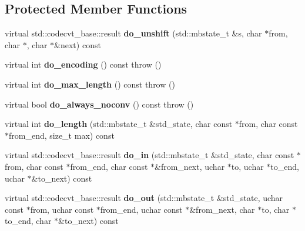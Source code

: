 \subsection*{Protected Member Functions}
\begin{DoxyCompactItemize}
\item 
virtual std\+::codecvt\+\_\+base\+::result {\bfseries do\+\_\+unshift} (std\+::mbstate\+\_\+t \&s, char $\ast$from, char $\ast$, char $\ast$\&next) const \label{classbooster_1_1locale_1_1generic__codecvt_3_01CharType_00_01CodecvtImpl_00_012_01_4_ac229b7b228bb3e6254ce32f538e8ef0f}

\item 
virtual int {\bfseries do\+\_\+encoding} () const   throw ()\label{classbooster_1_1locale_1_1generic__codecvt_3_01CharType_00_01CodecvtImpl_00_012_01_4_a7b264499fd7e204121b1d42c7a13c4b6}

\item 
virtual int {\bfseries do\+\_\+max\+\_\+length} () const   throw ()\label{classbooster_1_1locale_1_1generic__codecvt_3_01CharType_00_01CodecvtImpl_00_012_01_4_a0e8a98fbf8d36331f98c66575aee7115}

\item 
virtual bool {\bfseries do\+\_\+always\+\_\+noconv} () const   throw ()\label{classbooster_1_1locale_1_1generic__codecvt_3_01CharType_00_01CodecvtImpl_00_012_01_4_ab0f0b4d26cece69ee7858ce129322f1a}

\item 
virtual int {\bfseries do\+\_\+length} (std\+::mbstate\+\_\+t \&std\+\_\+state, char const $\ast$from, char const $\ast$from\+\_\+end, size\+\_\+t max) const \label{classbooster_1_1locale_1_1generic__codecvt_3_01CharType_00_01CodecvtImpl_00_012_01_4_aae2712941bdf422f8edf8496fe08384a}

\item 
virtual std\+::codecvt\+\_\+base\+::result {\bfseries do\+\_\+in} (std\+::mbstate\+\_\+t \&std\+\_\+state, char const $\ast$from, char const $\ast$from\+\_\+end, char const $\ast$\&from\+\_\+next, uchar $\ast$to, uchar $\ast$to\+\_\+end, uchar $\ast$\&to\+\_\+next) const \label{classbooster_1_1locale_1_1generic__codecvt_3_01CharType_00_01CodecvtImpl_00_012_01_4_afd50d49b70aa1e6f23e6f57db6ab9179}

\item 
virtual std\+::codecvt\+\_\+base\+::result {\bfseries do\+\_\+out} (std\+::mbstate\+\_\+t \&std\+\_\+state, uchar const $\ast$from, uchar const $\ast$from\+\_\+end, uchar const $\ast$\&from\+\_\+next, char $\ast$to, char $\ast$to\+\_\+end, char $\ast$\&to\+\_\+next) const \label{classbooster_1_1locale_1_1generic__codecvt_3_01CharType_00_01CodecvtImpl_00_012_01_4_a536966574cbfa153764202c35f740d7f}

\end{DoxyCompactItemize}


